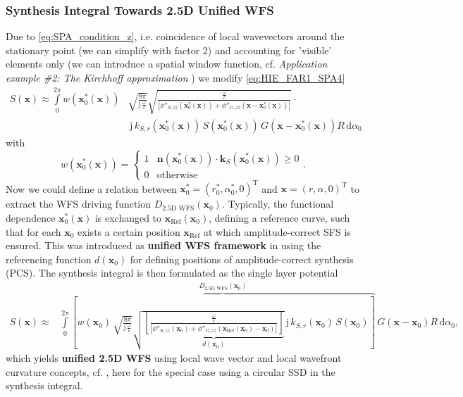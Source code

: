 \documentclass[a4paper,BCOR=15mm,10pt,twoside]{scrartcl}
\newcommand\im{\mathrm{j}}  %
\newcommand\fsd{\mathrm{d}}  %
\newcommand\wc{\frac{\omega}{c}}  %
\newcommand\jwc{\im\,\frac{\omega}{c}}  %
\newcommand\azx{\alpha}  %
\renewcommand{\vec}[1]{\mathbf{#1}}  %
\newcommand\unitn{\vec{n}}  %
\begin{document}
\subsubsection{Synthesis Integral Towards 2.5D Unified WFS}
Due to \eqref{eq:SPA_condition_z}, i.e. coincidence of local wavevectors around the stationary point (we can simplify with factor 2) and accounting for 'visible' elements only (we can introduce a spatial window function, cf. \textit{Application example \#2: The Kirchhoff approximation} \cite[p.46]{Firtha2018Diss}) we modify \eqref{eq:HIE_FAR1_SPA4}
%
\begin{align}
\label{eq:HIE_FAR1_SPA7}
S(\vec{x}) \approx \int\limits_{0}^{2\pi} 
w(\vec{x}_0^*(\vec{x})) & \sqrt{\frac{8\pi}{\jwc}}
\sqrt{\frac{\wc}{|\phi''_{S,zz}(\vec{x}_0^*(\vec{x}))+\phi''_{G,zz}(\vec{x}-\vec{x}_0^*(\vec{x}))|}} \cdot \nonumber\\
& \,\im \, k_{S,r}(\vec{x}_0^*(\vec{x})) \,
S(\vec{x}_0^*(\vec{x}))\,G(\vec{x}-\vec{x}_0^*(\vec{x}))
R \, \fsd \azx_0
\end{align}
%
with
%
\begin{equation}\label{eq:as}
w(\vec{x}_0^*(\vec{x})) =
    \begin{cases}
      1 & 
       \unitn(\vec{x}_0^*(\vec{x})) \cdot \vec{k}_S(\vec{x}_0^*(\vec{x})) \geq 0 \\
      0 & \text{otherwise}
    \end{cases}.
\end{equation}
%
Now we could define a relation between $\vec{x}_0^*=(r_0^*,\azx_0^*,0)^\mathrm{T}$ and $\vec{x}=(r,\azx,0)^\mathrm{T}$ to extract the WFS driving function $D_\text{2.5D WFS}(\vec{x}_0)$.
Typically, the functional dependence $\vec{x}_0^*(\vec{x})$ is exchanged to $\vec{x}_\text{Ref}(\vec{x}_0)$, defining a reference curve, such that for each $\vec{x}_0$ exists a certain position $\vec{x}_\text{Ref}$ at which amplitude-correct SFS is ensured.
This was introduced as \textbf{unified WFS framework} in \cite[Sec. IIIB]{Firtha2017} using the referencing function $d(\vec{x}_0)$ for defining positions of amplitude-correct synthesis (PCS).
The synthesis integral is then formulated as the single layer potential
%
\begin{align}
\label{eq:HIE_FAR1_SPA8}
S(\vec{x}) \approx & \int\limits_{0}^{2\pi}
\overbrace{\left[
w(\vec{x}_0)\,\sqrt{\frac{8\pi}{\jwc}}
\sqrt{\underbrace{\left[\frac{\wc}{|\phi''_{S,zz}(\vec{x}_0)+\phi''_{G,zz}(\vec{x}_\text{Ref}(\vec{x}_0)-\vec{x}_0)|}\right]}_{d(\vec{x}_0)}} 
\,\im \, k_{S,r}(\vec{x}_0) \,
S(\vec{x}_0)\right]}^{D_\text{2.5D WFS}(\vec{x}_0)}\,G(\vec{x}-\vec{x}_0)
R \, \fsd \azx_0,
\end{align}
%
which yields \textbf{unified 2.5D WFS} using local wave vector and local wavefront curvature concepts, cf. \cite[Sec. 4.1.3]{Firtha2018Diss}, here for the special case using a circular SSD in the synthesis integral.
\end{document}
